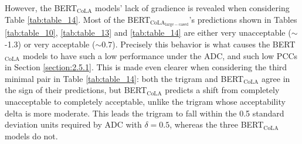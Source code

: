 However, the BERT$_\mathrm{CoLA}$ models' lack of gradience is revealed when considering Table \ref{tab:table_14}.  Most of the BERT$_\mathrm{CoLA_{large-cased}}$'s predictions shown in Tables \ref{tab:table_10}, \ref{tab:table_13} and \ref{tab:table_14} are either very unacceptable ($\sim$-1.3) or very acceptable ($\sim 0.7$).  Precisely this behavior is what causes the BERT$_\mathrm{CoLA}$ models to have such a low performance under the ADC, and such low PCCs in Section \ref{section:2.5.1}.  This is made even clearer when considering the third minimal pair in Table \ref{tab:table_14}: both the trigram and BERT$_\mathrm{CoLA}$ agree in the sign of their predictions, but BERT$_\mathrm{CoLA}$ predicts a shift from completely unacceptable to completely acceptable, unlike the trigram whose acceptability delta is more moderate.  This leads the trigram to fall within the 0.5 standard deviation units required by ADC with $\delta=0.5$, whereas the three BERT$_\mathrm{CoLA}$ models do not.

